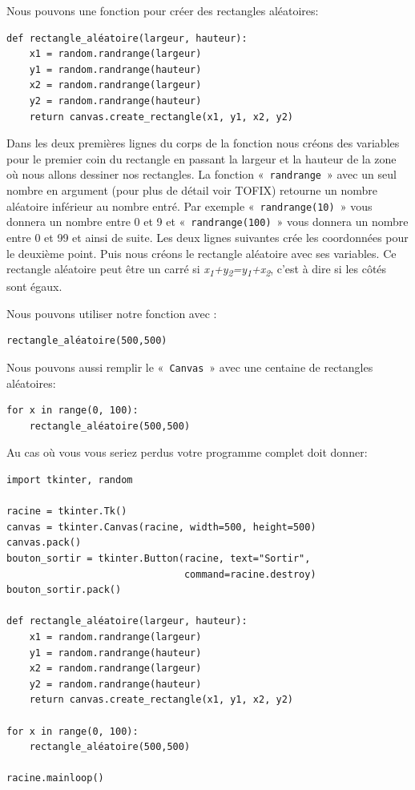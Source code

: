 Nous pouvons une fonction pour créer des rectangles aléatoires:
\begin{Verbatim}[frame=single,rulecolor=\color{mbleu}, label=à taper]
def rectangle_aléatoire(largeur, hauteur):
    x1 = random.randrange(largeur)
    y1 = random.randrange(hauteur)
    x2 = random.randrange(largeur)
    y2 = random.randrange(hauteur)
    return canvas.create_rectangle(x1, y1, x2, y2)
\end{Verbatim}

Dans les deux premières lignes du corps de la fonction nous créons des variables pour le premier coin du rectangle en passant la largeur et la hauteur de la zone où nous allons dessiner nos rectangles. 
La fonction «~\texttt{randrange}~» avec un seul nombre en argument (pour plus de détail voir TOFIX) retourne un nombre aléatoire inférieur au nombre entré. Par exemple «~\texttt{randrange(10)}~» vous donnera un nombre entre 0 et 9 et «~\texttt{randrange(100)}~» vous donnera un nombre entre 0 et 99 et ainsi de suite. Les deux lignes suivantes crée les coordonnées pour le deuxième point. Puis nous créons le rectangle aléatoire avec ses variables. Ce rectangle aléatoire peut être un carré si \emph{x\textsubscript{1}+y\textsubscript{2}=y\textsubscript{1}+x\textsubscript{2}}, c'est à dire si les côtés sont égaux.

Nous pouvons utiliser notre fonction avec :
\begin{Verbatim}[frame=single,rulecolor=\color{mbleu}, label=à taper]
rectangle_aléatoire(500,500)
\end{Verbatim}

Nous pouvons aussi remplir le «~\texttt{Canvas}~» avec une centaine de rectangles aléatoires:
\begin{Verbatim}[frame=single,rulecolor=\color{mbleu}, label=à taper]
for x in range(0, 100):
    rectangle_aléatoire(500,500)
\end{Verbatim}

Au cas où vous vous seriez perdus votre programme complet doit donner:

\begin{Verbatim}[frame=single,rulecolor=\color{mbleu}, label=à taper]
import tkinter, random

racine = tkinter.Tk()
canvas = tkinter.Canvas(racine, width=500, height=500)
canvas.pack()
bouton_sortir = tkinter.Button(racine, text="Sortir",
                               command=racine.destroy)
bouton_sortir.pack()

def rectangle_aléatoire(largeur, hauteur):
    x1 = random.randrange(largeur)
    y1 = random.randrange(hauteur)
    x2 = random.randrange(largeur)
    y2 = random.randrange(hauteur)
    return canvas.create_rectangle(x1, y1, x2, y2)

for x in range(0, 100):
    rectangle_aléatoire(500,500)

racine.mainloop()
\end{Verbatim}

